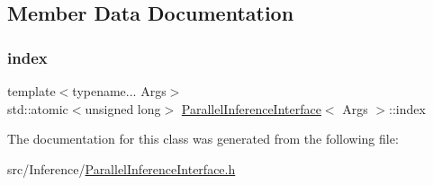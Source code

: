 \subsection{Member Data Documentation}
\mbox{\label{class_parallel_inference_interface_a7ae040da2f19cfb41851760759fc9b33}} 
\subsubsection{\texorpdfstring{index}{index}}
{\footnotesize\ttfamily template$<$typename... Args$>$ \\
std\+::atomic$<$unsigned long$>$ \hyperlink{class_parallel_inference_interface}{Parallel\+Inference\+Interface}$<$ Args $>$\+::index}



The documentation for this class was generated from the following file\+:\begin{DoxyCompactItemize}
\item 
src/\+Inference/\hyperlink{_parallel_inference_interface_8h}{Parallel\+Inference\+Interface.\+h}\end{DoxyCompactItemize}
